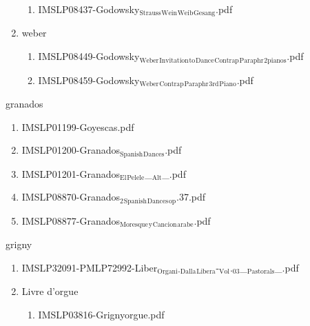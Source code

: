 \documentclass[11pt]{article}
\begin{document}
\begin{enumerate}
\begin{enumerate}
\item IMSLP08437-Godowsky$_{\text{Strauss}}$$_{\text{Wein}}$$_{\text{Weib}}$$_{\text{Gesang}}$.pdf
\label{sec-1-1-1-1-44-34-23-2}
\end{enumerate}

\item weber
\label{sec-1-1-1-1-44-34-24}
\begin{enumerate}
\item IMSLP08449-Godowsky$_{\text{Weber}}$$_{\text{Invitation}}$$_{\text{to}}$$_{\text{Dance}}$$_{\text{Contrap}}$$_{\text{Paraphr}}$$_{\text{2pianos}}$.pdf
\label{sec-1-1-1-1-44-34-24-1}

\item IMSLP08459-Godowsky$_{\text{Weber}}$$_{\text{Contrap}}$$_{\text{Paraphr}}$$_{\text{3rd}}$$_{\text{Piano}}$.pdf
\label{sec-1-1-1-1-44-34-24-2}
\end{enumerate}
\end{enumerate}

\item granados
\label{sec-1-1-1-1-44-35}
\begin{enumerate}
\item IMSLP01199-Goyescas.pdf
\label{sec-1-1-1-1-44-35-1}

\item IMSLP01200-Granados$_{\text{Spanish}}$$_{\text{Dances}}$.pdf
\label{sec-1-1-1-1-44-35-2}

\item IMSLP01201-Granados$_{\text{El}}$$_{\text{Pelele}}$\_$_{\text{Alt}}$\_.pdf
\label{sec-1-1-1-1-44-35-3}

\item IMSLP08870-Granados$_{\text{2}}$$_{\text{Spanish}}$$_{\text{Dances}}$$_{\text{op}}$.37.pdf
\label{sec-1-1-1-1-44-35-4}

\item IMSLP08877-Granados$_{\text{Moresque}}$$_{\text{y}}$$_{\text{Cancion}}$$_{\text{arabe}}$.pdf
\label{sec-1-1-1-1-44-35-5}
\end{enumerate}

\item grigny
\label{sec-1-1-1-1-44-36}
\begin{enumerate}
\item IMSLP32091-PMLP72992-Liber$_{\text{Organi}}$$_{\text{-Dalla}}$$_{\text{Libera}}$-$_{\text{Vol}}$.$_{\text{03}}$\_$_{\text{Pastorals}}$\_.pdf
\label{sec-1-1-1-1-44-36-1}

\item Livre d'orgue
\label{sec-1-1-1-1-44-36-2}
\begin{enumerate}
\item IMSLP03816-Grignyorgue.pdf
\label{sec-1-1-1-1-44-36-2-1}
\end{enumerate}
\end{enumerate}
\end{document}
